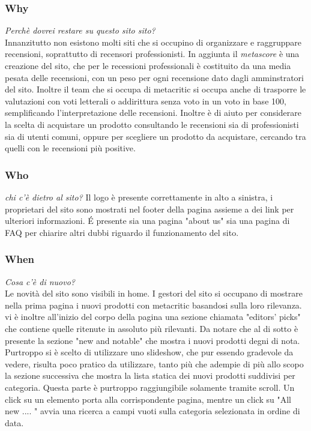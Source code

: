 \documentclass[12pt]{article}
\begin{document}
\subsubsection{Why}
\textit{Perchè dovrei restare su questo sito sito?}\\
Innanzitutto non esistono molti siti che si occupino di organizzare e raggruppare recensioni, soprattutto di recensori professionisti. In aggiunta il \textit{metascore} è una creazione del sito, che per le recessioni professionali è costituito da una media pesata delle recensioni, con un peso per ogni recensione dato dagli amminstratori del sito. Inoltre il team che si occupa di metacritic si occupa anche di trasporre le valutazioni con voti letterali o addirittura senza voto in un voto in base 100, semplificando l'interpretazione delle recensioni. Inoltre è di aiuto per considerare la scelta di acquistare un prodotto consultando le recensioni sia di professionisti sia di utenti comuni, oppure per scegliere un prodotto da acquistare, cercando tra quelli con le recensioni più positive.
\subsubsection{Who}
\textit{chi c'è dietro al sito?}
Il logo è presente correttamente in alto a sinistra, i proprietari del sito sono mostrati nel footer della pagina assieme a dei link per ulteriori informazioni. \'E presente sia una pagina "about us" sia una pagina di FAQ per chiarire altri dubbi riguardo il funzionamento del sito.
\subsubsection{When}
\textit{Cosa c'è di nuovo?}\\
Le novità del sito sono visibili in home. I gestori del sito si occupano di mostrare nella prima pagina i nuovi prodotti con metacritic basandosi sulla loro rilevanza. vi è inoltre all'inizio del corpo della pagina una sezione chiamata "editors' picks" che contiene quelle ritenute in assoluto più rilevanti. Da notare che al di sotto è presente la sezione "new and notable" che mostra i nuovi prodotti degni di nota. Purtroppo si è scelto di utilizzare uno slideshow, che pur essendo gradevole da vedere, risulta poco pratico da utilizzare, tanto più che adempie di più allo scopo la sezione successiva che mostra la lista statica dei nuovi prodotti suddivisi per categoria. Questa parte è purtroppo raggiungibile solamente tramite scroll. Un click su un elemento porta alla corrispondente pagina, mentre un click su "All new .... " avvia una ricerca a campi vuoti sulla categoria selezionata in ordine di data.
\end{document}

